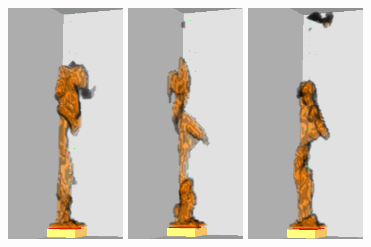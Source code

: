\documentclass[twoside]{uocthesis}
\begin{document}
\begin{figure}[p]
	\includegraphics[width=1.2in]{../Figures/FDSNG_Corner4}
	\includegraphics[width=1.2in]{../Figures/FDSNG_Corner5} 
	\includegraphics[width=1.2in]{../Figures/FDSNG_Corner6} \\


\end{figure}
\end{document}
